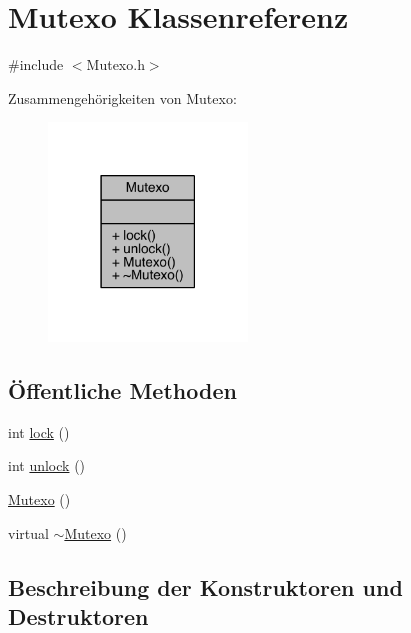 \hypertarget{class_mutexo}{}\section{Mutexo Klassenreferenz}
\label{class_mutexo}


{\ttfamily \#include $<$Mutexo.\+h$>$}



Zusammengehörigkeiten von Mutexo\+:\nopagebreak
\begin{figure}[H]
\begin{center}
\leavevmode
\includegraphics[width=150pt]{class_mutexo__coll__graph}
\end{center}
\end{figure}
\subsection*{Öffentliche Methoden}
\begin{DoxyCompactItemize}
\item 
int \hyperlink{class_mutexo_a22aac64070af68adc9acc1fef3d3f4aa}{lock} ()
\item 
int \hyperlink{class_mutexo_a9f51083616ed99edc2add313f840016c}{unlock} ()
\item 
\hyperlink{class_mutexo_a56f219370b120853d4176fb67a4fd847}{Mutexo} ()
\item 
virtual \hyperlink{class_mutexo_af8942ad328e7c91931f63e6a243081d1}{$\sim$\+Mutexo} ()
\end{DoxyCompactItemize}


\subsection{Beschreibung der Konstruktoren und Destruktoren}
\hypertarget{class_mutexo_a56f219370b120853d4176fb67a4fd847}{}\label{class_mutexo_a56f219370b120853d4176fb67a4fd847} 
